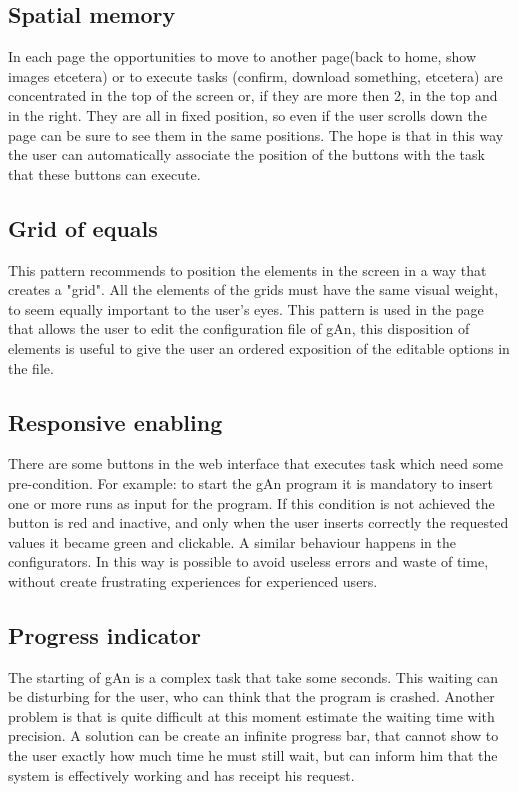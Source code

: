 \subsection{Spatial memory}
In each page the opportunities to move to another page(back to home, show images etcetera) or to execute tasks (confirm, download something, etcetera) are concentrated in the top of the screen or, if they are more then 2, in the top and in the right. They are all in fixed position, so even if the user scrolls down the page can be sure to see them in the same positions. The hope is that in this way the user can automatically associate the position of the buttons with the task that these buttons can execute.


\subsection{Grid of equals}

This pattern recommends to position the elements in the screen in a way that creates a "grid". All the elements of the grids must have the same visual weight, to seem equally important to the user's eyes.
This pattern is used in the page that allows the user to edit the configuration file of gAn, this disposition of elements is useful to give the user an ordered exposition of the editable options in the file.


\subsection{Responsive enabling}
There are some buttons in the web interface that executes task which need some pre-condition. For example: to start the gAn program it is mandatory to insert one or more runs as input for the program. If this condition is not achieved the button is red and inactive, and only when the user inserts correctly the requested values it became green and clickable. A similar behaviour happens in the configurators. In this way is possible to avoid useless errors and waste of time, without create frustrating experiences for experienced users. 

\subsection{Progress indicator}
The starting of gAn is a complex task that take some seconds. This waiting can be disturbing for the user, who can think that the program is crashed. Another problem is that is quite difficult at this moment estimate the waiting time with precision. A solution can be create an infinite progress bar, that cannot show to the user exactly how much time he must still wait, but can inform him that the system is effectively working and has receipt his request. 


